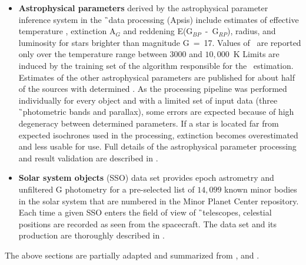 \begin{itemize}
	\item \textbf{Astrophysical parameters} derived by the astrophysical parameter inference system in the \G\ data processing (Apsis) include estimates of effective temperature \Teff, extinction A$_G$ and reddening E(G$_{BP}$~-~G$_{RP}$), radius, and luminosity for stars brighter than magnitude G~=~17. Values of \Teff\ are reported only over the temperature range between $3000$ and $10,000$~K Limits are induced by the training set of the algorithm responsible for the \Teff\ estimation. Estimates of the other astrophysical parameters are published for about half of the sources with determined \Teff. As the processing pipeline was performed individually for every object and with a limited set of input data (three \G\ photometric bands and parallax), some errors are expected because of high degeneracy between determined parameters. If a star is located far from expected isochrones used in the processing, extinction becomes overestimated and less usable for use. Full details of the astrophysical parameter processing and result validation are described in \citet{2018A&A...616A...8A}.	
	
	\item \textbf{Solar system objects} (SSO) data set provides epoch astrometry and unfiltered G photometry for a pre-selected list of $14,099$ known minor bodies in the solar system that are numbered in the Minor Planet Center repository. Each time a given SSO enters the field of view of \G\ telescopes, celestial positions are recorded as seen from the spacecraft. The data set and its production are thoroughly described in \citet{2018A&A...616A..13G}.
	
\end{itemize}

The above sections are partially adapted and summarized from \citet{2016A&A...595A...1G, 2018A&A...616A...1G}, and \cite{gaia_primer}.

